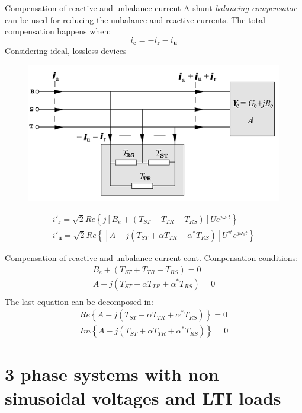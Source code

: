 \documentclass[aspectratio=169]{beamer}
\begin{document}
    \begin{frame}{Compensation of reactive and unbalance current}{\insertsection}
    A shunt \textit{balancing compensator} can be used for reducing the unbalance and reactive currents. The total compensation happens when:
    \begin{equation}
        \pmb{\mathit{i}_{c}} = -\pmb{\mathit{i}_{r}}-\pmb{\mathit{i}_{u}}
    \end{equation}
    Considering ideal, lossless devices
    \begin{figure}
        \centering
        \includegraphics[width=0.3\columnwidth]{3P_compensator.png}
    \end{figure}

    \begin{gather}
        \pmb{\mathit{i'}_{r}}=\sqrt{2}Re\left\{j\left[B_e + (T_{ST} + T_{TR} + T_{RS})\right] \pmb{\mathit{U}}e^{j\omega_1 t} \right\} \\
        \pmb{\mathit{i'}_{u}}=\sqrt{2}Re\left\{\left[A - j(T_{ST} + \alpha T_{TR} + \alpha^*T_{RS})\right] \pmb{\mathit{U^{\#}}}e^{j\omega_1 t} \right\} 
    \end{gather}

    \end{frame}
    \begin{frame}{Compensation of reactive and unbalance current-cont.}{\insertsection}
    Compensation conditions:
    \begin{gather}
        B_e + (T_{ST} + T_{TR} + T_{RS}) = 0\\
        A - j(T_{ST} + \alpha T_{TR} + \alpha^*T_{RS}) = 0\\
    \end{gather}
    The last equation can be decomposed in:
    \begin{gather}
        Re\left\{A - j(T_{ST} + \alpha T_{TR} + \alpha^*T_{RS})\right\}=0\\
        Im\left\{A - j(T_{ST} + \alpha T_{TR} + \alpha^*T_{RS})\right\}=0
    \end{gather}
    
    \end{frame}


\section{3 phase systems with non sinusoidal voltages and LTI loads}
\end{document}
